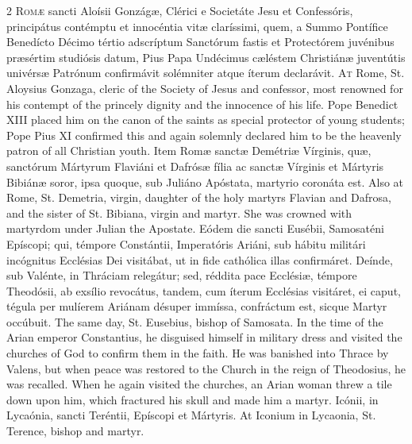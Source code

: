 \begin{paracol}{2}
\lettrine[lines=2]{R}{omæ} sancti Aloísii 
 Gonzágæ, Clérici e Societáte Jesu et Confessóris, principátus contémptu et 
 innocéntia vitæ claríssimi, quem, a Summo Pontífice Benedícto Décimo tértio 
 adscríptum Sanctórum fastis et Protectórem juvénibus præsértim studiósis datum, Pius Papa Undécimus cæléstem Christiánæ juventútis univérsæ Patrónum 
 confirmávit solémniter atque íterum declarávit.
\switchcolumn
{}
\lettrine[lines=2]{A}{t} Rome, St. Aloysius Gonzaga, 
 cleric of the Society of Jesus and confessor, most renowned for his contempt 
 of the princely dignity and the innocence of his life. Pope Benedict 
 XIII placed him on the canon of the saints as special protector of young 
 students; Pope Pius XI confirmed this and again solemnly declared him to be 
 the heavenly patron of all Christian youth.
\switchcolumn*
{}
Item Romæ sanctæ 
 Demétriæ Vírginis, quæ, sanctórum Mártyrum Flaviáni et Dafrósæ fília ac 
 sanctæ Vírginis et Mártyris Bibiánæ soror, ipsa quoque, sub Juliáno Apóstata, 
 martyrio coronáta est.
\switchcolumn
{}
Also at Rome, St. Demetria, virgin, 
 daughter of the holy martyrs Flavian and Dafrosa, and the sister of St. 
 Bibiana, virgin and martyr. She was crowned with martyrdom under 
 Julian the Apostate.
\switchcolumn*
{}
Eódem die sancti 
 Eusébii, Samosaténi Epíscopi; qui, témpore Constántii, Imperatóris Ariáni, 
 sub hábitu militári incógnitus Ecclésias Dei visitábat, ut in fide cathólica 
 illas confirmáret. Deínde, sub Valénte, in Thráciam relegátur; sed, 
 réddita pace Ecclésiæ, témpore Theodósii, ab exsílio revocátus, tandem, cum 
 íterum Ecclésias visitáret, ei caput, tégula per mulíerem Ariánam désuper 
 immíssa, confráctum est, sicque Martyr occúbuit.
\switchcolumn
{}
The same day, St. Eusebius, bishop 
 of Samosata. In the time of the Arian emperor Constantius, he 
 disguised himself in military dress and visited the churches of God to 
 confirm them in the faith. He was banished into Thrace by Valens, but 
 when peace was restored to the Church in the reign of Theodosius, he was 
 recalled. When he again visited the churches, an Arian woman threw a 
 tile down upon him, which fractured his skull and made him a martyr.
\switchcolumn*
{}
Icónii, in Lycaónia, 
 sancti Teréntii, Epíscopi et Mártyris.
\switchcolumn
{}
At Iconium in Lycaonia, St. Terence, 
 bishop and martyr.
\switchcolumn*
{}

\end{paracol}
